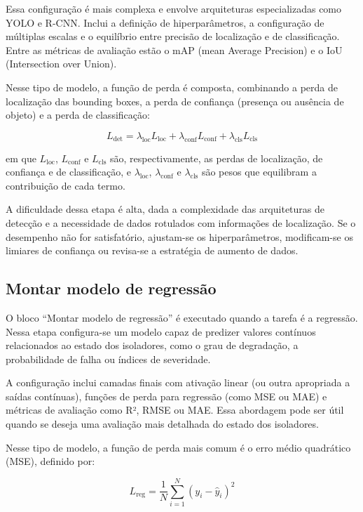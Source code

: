 Essa configuração é mais complexa e envolve arquiteturas especializadas como YOLO e R-CNN. Inclui a definição de hiperparâmetros, a configuração de múltiplas escalas e o equilíbrio entre precisão de localização e de classificação. Entre as métricas de avaliação estão o mAP (mean Average Precision) e o IoU (Intersection over Union).

Nesse tipo de modelo, a função de perda é composta, combinando a perda de localização das bounding boxes, a perda de confiança (presença ou ausência de objeto) e a perda de classificação:

\begin{equation}
    L_{\text{det}} = \lambda_{\text{loc}} L_{\text{loc}} + \lambda_{\text{conf}} L_{\text{conf}} + \lambda_{\text{cls}} L_{\text{cls}}
    \label{eq:perda_deteccao}
\end{equation}

em que $L_{\text{loc}}$, $L_{\text{conf}}$ e $L_{\text{cls}}$ são, respectivamente, as perdas de localização, de confiança e de classificação, e $\lambda_{\text{loc}}$, $\lambda_{\text{conf}}$ e $\lambda_{\text{cls}}$ são pesos que equilibram a contribuição de cada termo.

A dificuldade dessa etapa é alta, dada a complexidade das arquiteturas de detecção e a necessidade de dados rotulados com informações de localização. Se o desempenho não for satisfatório, ajustam-se os hiperparâmetros, modificam-se os limiares de confiança ou revisa-se a estratégia de aumento de dados.

\subsection{Montar modelo de regressão}
O bloco ``Montar modelo de regressão'' é executado quando a tarefa é a regressão. Nessa etapa configura-se um modelo capaz de predizer valores contínuos relacionados ao estado dos isoladores, como o grau de degradação, a probabilidade de falha ou índices de severidade.

A configuração inclui camadas finais com ativação linear (ou outra apropriada a saídas contínuas), funções de perda para regressão (como MSE ou MAE) e métricas de avaliação como R², RMSE ou MAE. Essa abordagem pode ser útil quando se deseja uma avaliação mais detalhada do estado dos isoladores.

Nesse tipo de modelo, a função de perda mais comum é o erro médio quadrático (MSE), definido por:

\begin{equation}
    L_{\text{reg}} = \frac{1}{N} \sum_{i=1}^{N} (y_i - \hat{y}_i)^2
    \label{eq:perda_regressao}
\end{equation}

